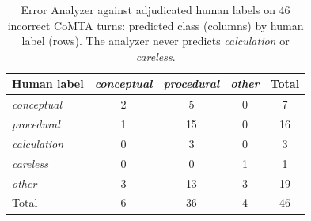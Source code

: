 \begin{table}[t]
\centering
\caption{Error Analyzer against adjudicated human labels on 46 incorrect CoMTA turns: predicted class (columns) by human label (rows). The analyzer never predicts \emph{calculation} or \emph{careless}.}\label{tab:ea-cm}
\small
\begin{tabular}{lcccc}
\toprule
Human label & \emph{conceptual} & \emph{procedural} & \emph{other} & Total \\
\midrule
\emph{conceptual} & 2 & 5 & 0 & 7 \\
\emph{procedural} & 1 & 15 & 0 & 16 \\
\emph{calculation} & 0 & 3 & 0 & 3 \\
\emph{careless} & 0 & 0 & 1 & 1 \\
\emph{other} & 3 & 13 & 3 & 19 \\
\midrule
Total & 6 & 36 & 4 & 46 \\
\bottomrule
\end{tabular}
\end{table}
